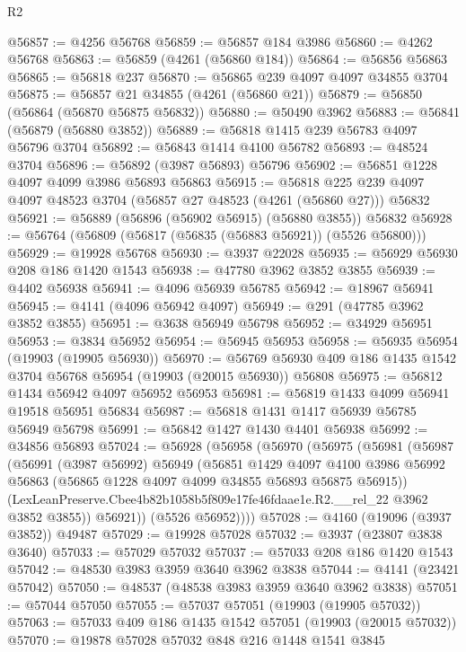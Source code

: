 \begin{lexlean}{R2}
\begin{coremodule}
@56857 := @4256 @56768
@56859 := @56857 @184 @3986
@56860 := @4262 @56768
@56863 := @56859 (@4261 (@56860 @184))
@56864 := @56856 @56863
@56865 := @56818 @237
@56870 := @56865 @239 @4097 @4097 @34855 @3704
@56875 := @56857 @21 @34855 (@4261 (@56860 @21))
@56879 := @56850 (@56864 (@56870 @56875 @56832))
@56880 := @50490 @3962
@56883 := @56841 (@56879 (@56880 @3852))
@56889 := @56818 @1415 @239 @56783 @4097 @56796 @3704
@56892 := @56843 @1414 @4100 @56782
@56893 := @48524 @3704
@56896 := @56892 (@3987 @56893) @56796
@56902 := @56851 @1228 @4097 @4099 @3986 @56893 @56863
@56915 := @56818 @225 @239 @4097 @4097 @48523 @3704 (@56857 @27 @48523 (@4261 (@56860 @27))) @56832
@56921 := @56889 (@56896 (@56902 @56915) (@56880 @3855)) @56832
@56928 := @56764 (@56809 (@56817 (@56835 (@56883 @56921)) (@5526 @56800)))
@56929 := @19928 @56768
@56930 := @3937 @22028
@56935 := @56929 @56930 @208 @186 @1420 @1543
@56938 := @47780 @3962 @3852 @3855
@56939 := @4402 @56938
@56941 := @4096 @56939 @56785
@56942 := @18967 @56941
@56945 := @4141 (@4096 @56942 @4097)
@56949 := @291 (@47785 @3962 @3852 @3855)
@56951 := @3638 @56949 @56798
@56952 := @34929 @56951
@56953 := @3834 @56952
@56954 := @56945 @56953
@56958 := @56935 @56954 (@19903 (@19905 @56930))
@56970 := @56769 @56930 @409 @186 @1435 @1542 @3704 @56768 @56954 (@19903 (@20015 @56930)) @56808
@56975 := @56812 @1434 @56942 @4097 @56952 @56953
@56981 := @56819 @1433 @4099 @56941 @19518 @56951 @56834
@56987 := @56818 @1431 @1417 @56939 @56785 @56949 @56798
@56991 := @56842 @1427 @1430 @4401 @56938
@56992 := @34856 @56893
@57024 := @56928
    (@56958
      (@56970
        (@56975
          (@56981
            (@56987
              (@56991
                (@3987 @56992)
                @56949
                (@56851
                  @1429
                  @4097
                  @4100
                  @3986
                  @56992
                  @56863
                  (@56865 @1228 @4097 @4099 @34855 @56893 @56875 @56915))
                (LexLeanPreserve.Cbee4b82b1058b5f809e17fe46fdaae1e.R2.__rel_22 @3962 @3852 @3855))
              @56921))
          (@5526 @56952))))
@57028 := @4160 (@19096 (@3937 @3852)) @49487
@57029 := @19928 @57028
@57032 := @3937 (@23807 @3838 @3640)
@57033 := @57029 @57032
@57037 := @57033 @208 @186 @1420 @1543
@57042 := @48530 @3983 @3959 @3640 @3962 @3838
@57044 := @4141 (@23421 @57042)
@57050 := @48537 (@48538 @3983 @3959 @3640 @3962 @3838)
@57051 := @57044 @57050
@57055 := @57037 @57051 (@19903 (@19905 @57032))
@57063 := @57033 @409 @186 @1435 @1542 @57051 (@19903 (@20015 @57032))
@57070 := @19878 @57028 @57032 @848 @216 @1448 @1541 @3845

\end{coremodule}
\end{lexlean}
